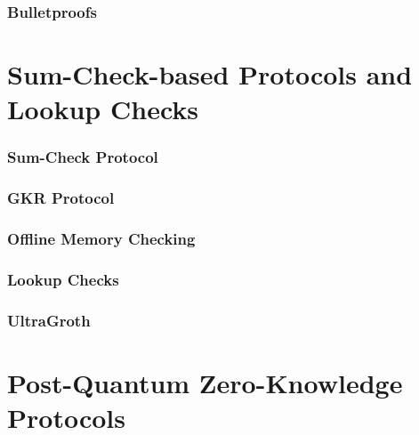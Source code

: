 \documentclass{config/zkdl-template}
\begin{document}
    \section{Bulletproofs}\label{section:bulletproofs}
    

    \part{Sum-Check-based Protocols and Lookup Checks}
    

    \section{Sum-Check Protocol}\label{section:sumcheck}
    

    \section{GKR Protocol}\label{section:gkr}
    
    
    \section{Offline Memory Checking}\label{section:toolkit}
    

    \section{Lookup Checks}\label{section:lookups}
    

    \section{UltraGroth}\label{section:ultragroth}
    

    \part{Post-Quantum Zero-Knowledge Protocols}
    
\end{document}
